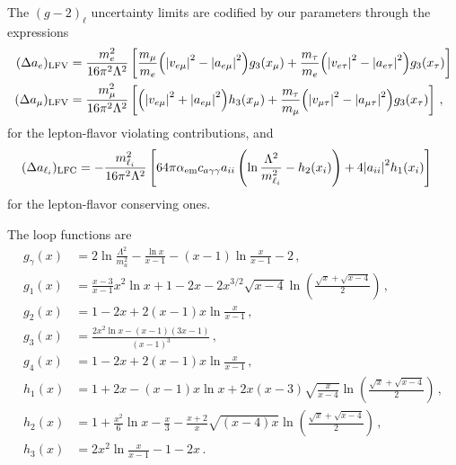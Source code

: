 \documentclass[prd,amsfonts,onecolumn,superscriptaddress,aps,nofootinbib,11pt]{revtex4-1}
\begin{document}
The $(g-2)_{\ell}$ uncertainty limits are codified by our parameters through the expressions
\begin{equation}\label{eq:g-2}
    \begin{split}
        (\Delta a_e)_{\rm{LFV}} &=  \frac{m_e^2}{16 \pi^2 \Lambda^2} \left[ \frac{m_\mu}{m_e}\qty(\abs{v_{e\mu}}^2- \abs{a_{e\mu}}^2)g_3(x_\mu) + \frac{m_\tau}{m_e} \qty( \abs{v_{e \tau}}^2 - \abs{a_{e \tau}}^2)g_3(x_\tau)  \right] \\
        (\Delta a_\mu)_{\rm{LFV}} &= \frac{m_\mu^2}{16 \pi^2 \Lambda^2} \left[ \qty(\abs{v_{e\mu}}^2+ \abs{a_{e\mu}}^2)h_3(x_\mu) + \frac{m_\tau}{m_\mu} \qty( \abs{v_{\mu \tau}}^2 - \abs{a_{\mu \tau}}^2)g_3(x_\tau)  \right] \,,
    \end{split}
\end{equation}
for the lepton-flavor violating contributions, and
\begin{equation}
    \begin{split}
        (\Delta a_{\ell_i})_{\rm{LFC}} &=  -\frac{m_{\ell_i}^2}{16 \pi^2 \Lambda^2} \left[ 64\pi \alpha_{\mathrm{em}} c_{a \gamma \gamma} a_{ii} \left(\ln \frac{\Lambda^2}{m_{\ell_i}^2} - h_2(x_i) \right) + 4 \abs{a_{ii}}^2 h_1(x_i)  \right]
    \end{split}
\end{equation}
for the lepton-flavor conserving ones.

The loop functions are
\begin{equation}
    \begin{split}
        g_\gamma(x) &= 2 \ln \frac{\Lambda^2}{m_a^2} - \frac{\ln x}{x - 1} - (x-1) \ln \frac{x}{x-1} - 2 \,,\\
        g_1(x) &= \frac{x-3}{x-1}x^2 \ln x + 1 -2x - 2 x^{3/2} \sqrt{x-4} \ln \left( \frac{\sqrt{x}+ \sqrt{x-4}}{2} \right) \,, \\
        g_2(x) &= 1 - 2x + 2(x-1)x \ln \frac{x}{x-1} \,, \\
        g_3(x) &= \frac{2x^2 \ln x - (x-1)(3x-1)}{(x-1)^3} \,, \\
        g_4(x) &= 1 - 2x + 2(x-1)x \ln \frac{x}{x-1}  \,, \\
        h_1(x) &= 1 + 2x - (x-1)x \ln x + 2x(x-3)\sqrt{\frac{x}{x-4}} \ln \left( \frac{\sqrt{x}+ \sqrt{x-4}}{2} \right) \,, \\
        h_2(x) &= 1 + \frac{x^2}{6} \ln x - \frac{x}{3} - \frac{x+2}{x}\sqrt{(x-4)x} \ln \left( \frac{\sqrt{x}+ \sqrt{x-4}}{2} \right) \,, \\
        h_3(x) &= 2x^2 \ln \frac{x}{x-1} -1 -2x\,.
    \end{split}
\end{equation}

 
\end{document}
